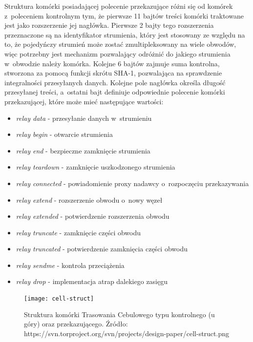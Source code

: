 Struktura komórki posiadającej polecenie przekazujące różni się od komórek z~poleceniem kontrolnym tym, że pierwsze 11 bajtów treści komórki traktowane jest jako rozszerzenie jej nagłówka. Pierwsze 2 bajty tego rozszerzenia przeznaczone są na identyfikator strumienia, który jest stosowany ze względu na to, że pojedyńczy strumień może zostać zmultipleksowany na wiele obwodów, więc potrzebny jest mechanizm pozwalający odróżnić do jakiego strumienia w~obwodzie należy komórka. Kolejne 6 bajtów zajmuje suma kontrolna, stworzona za pomocą funkcji skrótu SHA-1, pozwalająca na sprawdzenie integralności przesyłanych danych. Kolejne pole nagłówka określa długość przesyłanej treści, a~ostatni bajt definiuje odpowiednie polecenie komórki przekazującej, które może mieć następujące wartości:

\begin{itemize}
\setlength\itemsep{0mm}
 \item \textit{relay data} - przesyłanie danych w~strumieniu
 \item \textit{relay begin} - otwarcie strumienia
 \item \textit{relay end} - bezpieczne zamknięcie strumienia
 \item \textit{relay teardown} - zamknięcie uszkodzonego strumienia
 \item \textit{relay connected} - powiadomienie proxy nadawcy o~rozpoczęciu przekazywania
 \item \textit{relay extend} - rozszerzenie obwodu o~nowy węzeł
 \item \textit{relay extended} - potwierdzenie rozszerzenia obwodu
 \item \textit{relay truncate} - zamknięcie części obwodu
 \item \textit{relay truncated} - potwierdzenie zamknięcia części obwodu
 \item \textit{relay sendme} - kontrola przeciążenia
 \item \textit{relay drop} - implementacja atrap dalekiego zasięgu\cite{tor_design}
\end{itemize}

\begin{figure}
 \centering
 \texttt{[image: cell-struct]}
 \caption[Caption for LOR]{
  Struktura komórki Trasowania Cebulowego typu kontrolnego (u góry) oraz przekazującego.\newline
  Źródło: https://svn.torproject.org/svn/projects/design-paper/cell-struct.png}
 \label{rys:cell}
\end{figure}

